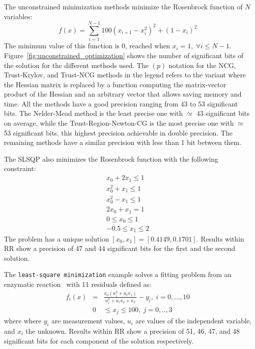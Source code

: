 \documentclass[11pt]{article}
\newcommand{\tristan}[1]{\color{orange}\textbf{From Tristan:} #1\color{black}\xspace}
\newcommand{\Yohan}[1]{\color{green!75!black}\textbf{Yohan:} #1\color{black}\xspace}
\begin{document}
The unconstrained minimization methods minimize the Rosenbrock function of $N$ variables:
\[f(x) = \sum_{i=1}^{N-1} 100(x_{i+1}-x^2_i)^2 + (1-x_i)^2\]
The minimum value of this function is 0, reached when $x_i=1,\; \forall i \leq N-1$. %
Figure~\ref{fig:unconstrained_optimization} shows the number of significant bits of the solution for the different methods used. 
The $(p)$ notation for the NCG, Trust-Krylov, and Trust-NCG methods in the legend refers 
to the variant where the Hessian matrix is replaced by 
a function computing the matrix-vector product of the Hessian and an arbitrary vector
that allows saving memory and time. 
All the methods have a good precision ranging from 43 to 53 significant bits. The Nelder-Mead method is the least precise one with $\simeq$ 43 significant bits on average, while the Trust-Region-Newton-CG is the most precise one with $\simeq$ 53 significant bits, this highest precision achievable in double precision. The remaining methods have a similar precision with less than 1 bit between them. 

The SLSQP also minimizes the Rosenbrock function with the following constraint:
\begin{eqnarray*}
    x_0 + 2x_1 \leq 1 \\
    x_0^2 + x_1 \leq 1 \\
    x_0^2 - x_1 \leq 1 \\
    2x_0 + x_1 = 1 \\
    0 \leq x_0 \leq 1 \\
    -0.5 \leq x_1 \leq 2 
\end{eqnarray*}
The problem has a unique solution $[x_0, x_1] = [0.4149, 0.1701]$.
Results within RR show a precision of 47 and 44 significant bits for the first and the second solution. %

The \texttt{least-square minimization} example solves a fitting problem from an enzymatic reaction~\cite{kowalik1968analysis} with 11 residuals defined as:
\begin{eqnarray*}
f_i(x) &=& \frac{x_0(u_i^2 + u_ix_1)}{u_i^2 + u_ix_2+x_3}-y_i,\; i=0,...,10 \\
&0& \leq x_j \leq 100,\; j=0,..,3
\end{eqnarray*}
where where $y_i$ are measurement values, $u_i$ are values of the independent variable, and
$x_i$ the unknown.
Results within RR show a precision of 51, 46, 47, and 48 significant bits for each component of the solution respectively.%
\end{document}
